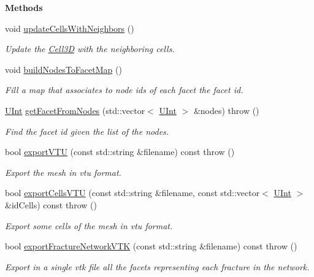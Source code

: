 \begin{Indent}{\bf Methods}
\begin{DoxyCompactItemize}
void \hyperlink{classFVCode3D_1_1Mesh3D_a32920906ccad9ef0572ebc4009214c86}{update\+Cells\+With\+Neighbors} ()
\begin{DoxyCompactList}\small\item\em Update the \hyperlink{classFVCode3D_1_1Mesh3D_1_1Cell3D}{Cell3D} with the neighboring cells. \end{DoxyCompactList}\item 
void \hyperlink{classFVCode3D_1_1Mesh3D_a609f980329f5a98e9fad724049e509d2}{build\+Nodes\+To\+Facet\+Map} ()
\begin{DoxyCompactList}\small\item\em Fill a map that associates to node ids of each facet the facet id. \end{DoxyCompactList}\item 
\hyperlink{namespaceFVCode3D_a4bf7e328c75d0fd504050d040ebe9eda}{U\+Int} \hyperlink{classFVCode3D_1_1Mesh3D_a2ac0b84c13a15ed42cdd8c98066eae98}{get\+Facet\+From\+Nodes} (std\+::vector$<$ \hyperlink{namespaceFVCode3D_a4bf7e328c75d0fd504050d040ebe9eda}{U\+Int} $>$ \&nodes)  throw ()
\begin{DoxyCompactList}\small\item\em Find the facet id given the list of the nodes. \end{DoxyCompactList}\item 
bool \hyperlink{classFVCode3D_1_1Mesh3D_a9c8350dc981d42ba80f37625cf978d3c}{export\+V\+TU} (const std\+::string \&filename) const   throw ()
\begin{DoxyCompactList}\small\item\em Export the mesh in vtu format. \end{DoxyCompactList}\item 
bool \hyperlink{classFVCode3D_1_1Mesh3D_a77553756736b340eb9de044471b73150}{export\+Cells\+V\+TU} (const std\+::string \&filename, const std\+::vector$<$ \hyperlink{namespaceFVCode3D_a4bf7e328c75d0fd504050d040ebe9eda}{U\+Int} $>$ \&id\+Cells) const   throw ()
\begin{DoxyCompactList}\small\item\em Export some cells of the mesh in vtu format. \end{DoxyCompactList}\item 
bool \hyperlink{classFVCode3D_1_1Mesh3D_a98c0a7dd95e33c21e813f9402d71da15}{export\+Fracture\+Network\+V\+TK} (const std\+::string \&filename) const   throw ()
\begin{DoxyCompactList}\small\item\em Export in a single vtk file all the facets representing each fracture in the network. \end{DoxyCompactList}\item 

\end{DoxyCompactItemize}
\end{Indent}
